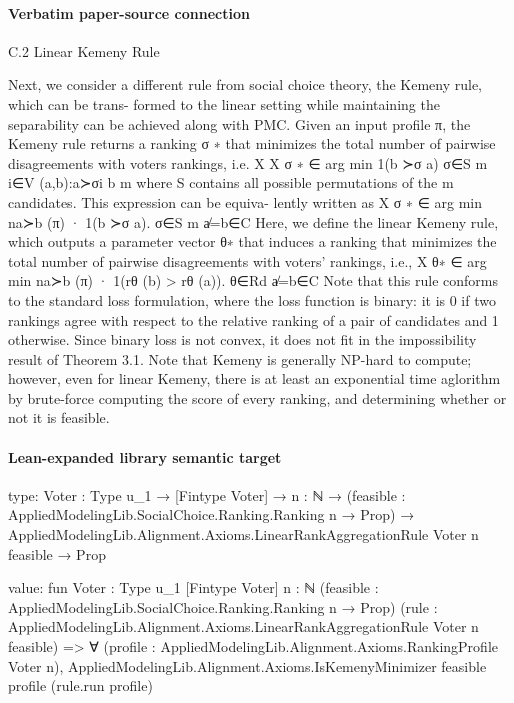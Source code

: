 \documentclass[10pt]{article}
\begin{document}
\paragraph{Verbatim paper-source connection}
\begin{ReviewVerbatim}
C.2   Linear Kemeny Rule

Next, we consider a different rule from social choice theory, the Kemeny rule, which can be trans-
formed to the linear setting while maintaining the separability can be achieved along with PMC.
Given an input profile π, the Kemeny rule returns a ranking σ ∗ that minimizes the total number of
pairwise disagreements with voters rankings, i.e.
                                            X X
                              σ ∗ ∈ arg min                1(b ≻σ a)
                                        σ∈S m
                                                 i∈V (a,b):a≻σi b
        m
where S contains all possible permutations of the m candidates. This expression can be equiva-
lently written as                        X
                          σ ∗ ∈ arg min        na≻b (π) · 1(b ≻σ a).
                                      σ∈S m
                                                a̸=b∈C
Here, we define the linear Kemeny rule, which outputs a parameter vector θ∗ that induces a ranking
that minimizes the total number of pairwise disagreements with voters’ rankings, i.e.,
                                        X
                          θ∗ ∈ arg min       na≻b (π) · 1(rθ (b) > rθ (a)).
                                 θ∈Rd    a̸=b∈C
Note that this rule conforms to the standard loss formulation, where the loss function is binary: it is
0 if two rankings agree with respect to the relative ranking of a pair of candidates and 1 otherwise.
Since binary loss is not convex, it does not fit in the impossibility result of Theorem 3.1.
Note that Kemeny is generally NP-hard to compute; however, even for linear Kemeny, there is
at least an exponential time aglorithm by brute-force computing the score of every ranking, and
determining whether or not it is feasible.
\end{ReviewVerbatim}



\paragraph{Lean-expanded library semantic target}
\begin{ReviewVerbatim}
type:
{Voter : Type u_1} →
  [Fintype Voter] →
    {n : ℕ} →
      (feasible : AppliedModelingLib.SocialChoice.Ranking.Ranking n → Prop) →
        AppliedModelingLib.Alignment.Axioms.LinearRankAggregationRule Voter n feasible → Prop

value:
fun {Voter : Type u_1} [Fintype Voter] {n : ℕ} (feasible : AppliedModelingLib.SocialChoice.Ranking.Ranking n → Prop)
    (rule : AppliedModelingLib.Alignment.Axioms.LinearRankAggregationRule Voter n feasible) =>
  ∀ (profile : AppliedModelingLib.Alignment.Axioms.RankingProfile Voter n),
    AppliedModelingLib.Alignment.Axioms.IsKemenyMinimizer feasible profile (rule.run profile)
\end{ReviewVerbatim}
\end{document}
